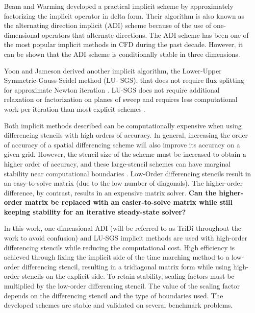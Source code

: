 \documentclass[conf]{new-aiaa}
\begin{document}
Beam and Warming \cite{Beam} developed a practical implicit scheme by approximately factorizing the implicit operator in delta form. 
Their algorithm is also known as the alternating direction implicit (ADI) scheme because of the use of one-dimensional operators that alternate directions. 
The ADI scheme has been one of the most popular implicit methods in CFD during the past decade. 
However, it can be shown that the ADI scheme is conditionally stable in three dimensions. 

Yoon and Jameson derived another implicit algorithm, the Lower-Upper Symmetric-Gauss-Seidel method (LU- SGS), that does not require flux splitting for approximate Newton iteration \cite{LUSGS}. 
LU-SGS does not require additional relaxation or factorization on planes of sweep and requires less computational work per iteration than most explicit schemes \cite{YoonLUSGS}.

Both implicit methods described can be computationally expensive when using differencing stencils with high orders of accuracy. 
In general, increasing the order of accuracy of a spatial differencing scheme will also improve its accuracy on a given grid. 
However, the stencil size of the scheme must be increased to obtain a higher order of accuracy, and these large-stencil schemes can have marginal stability near computational boundaries \cite{RDRP}. 
Low-Order differencing stencils result in an easy-to-solve matrix (due to the low number of diagonals).
The higher-order difference, by contrast, results in an expensive matrix solver. 
\textbf{Can the higher-order matrix be replaced with an easier-to-solve matrix while still keeping stability for an iterative steady-state solver?}

In this work, one dimensional ADI (will be referred to as TriDi throughout the work to avoid confusion) and LU-SGS implicit methods are used with high-order differencing stencils while reducing the computational cost. 
High efficiency is achieved through fixing the implicit side of the time marching method to a low-order differencing stencil, resulting in a tridiagonal matrix form while using high-order stencils on the explicit side. 
To retain stability, scaling factors must be multiplied by the low-order differencing stencil.
The value of the scaling factor depends on the differencing stencil and the type of boundaries used. 
The developed schemes are stable and validated on several benchmark problems. 
\end{document}
